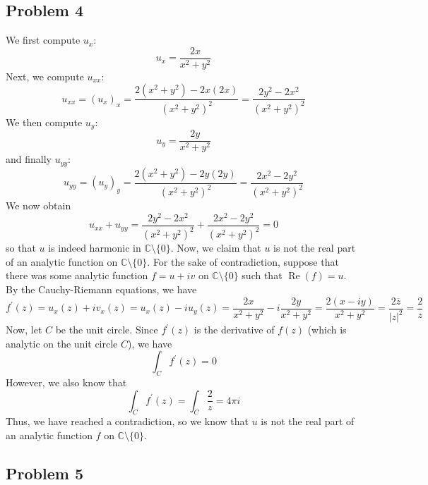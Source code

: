\documentclass[12pt]{article}
\newcommand{\cc}{{\mathbb C}}
\DeclareMathOperator{\re}{Re}
\begin{document}
\subsection*{Problem 4}
We first compute $u_x$:
\[
u_x = \frac{2x}{x^2+y^2} 
\] Next, we compute $u_{xx}$:
\[
u_{xx} = (u_x)_x = \frac{2(x^2+y^2) - 2x(2x)}{(x^2+y^2)^2} = \frac{2y^2 - 2x^2}{(x^2+y^2)^2}
\] We then compute $u_y$:
\[
u_y = \frac{2y}{x^2+y^2}
\] and finally $u_{yy}$:
\[
u_{yy} = (u_y)_y = \frac{2(x^2+y^2) - 2y(2y)}{(x^2+y^2)^2} = \frac{2x^2 - 2y^2}{(x^2+y^2)^2}
\] We now obtain
\[
u_{xx} + u_{yy} = \frac{2y^2 - 2x^2}{(x^2+y^2)^2} + \frac{2x^2 - 2y^2}{(x^2+y^2)^2} = 0
\] so that $u$ is indeed harmonic in $\cc \setminus \{0\}$. Now, we claim that $u$ is not the real part of an analytic function on $\cc \setminus \{0\}$. For the sake of contradiction, suppose that there was some analytic function $f = u + iv$ on $\cc \setminus \{0\}$ such that $\re(f) = u$. By the Cauchy-Riemann equations, we have
\[
f^\prime(z) = u_x(z) + iv_x(z) = u_x(z) - i u_y(z) = \frac{2x}{x^2+y^2} - i\frac{2y}{x^2+y^2} = \frac{2(x-iy)}{x^2+y^2} = \frac{2\overline{z}}{\vert z \vert^2} = \frac{2}{z}
\] Now, let $C$ be the unit circle. Since $f^\prime(z)$ is the derivative of $f(z)$ (which is analytic on the unit circle $C$), we have
\[
\int_C f^\prime(z) = 0
\] However, we also know that
\[
\int_C f^\prime(z) = \int_C \frac{2}{z} = 4\pi i
\] Thus, we have reached a contradiction, so we know that $u$ is not the real part of an analytic function $f$ on $\cc \setminus \{0\}$.
\newpage
\subsection*{Problem 5}
\end{document}
